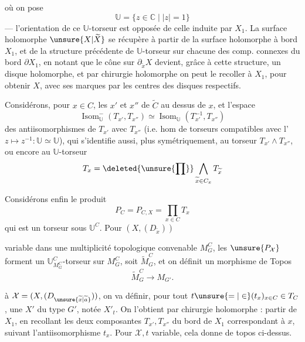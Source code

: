 où on pose
\[
\mathbb{U}=\{z\in\mathbb{C}\mid |z|=1\}
\]
--- l'orientation de ce $\mathbb{U}$-torseur  est opposée de celle induite par $X_1$.  La surface holomorphe $\unsure{X|\widetilde X}$  se récupère à partir de la surface holomorphe à bord $X_1$, et de la structure précédente de $\mathbb{U}$-torseur sur chacune des comp. connexes  du bord $\partial X_1$, en notant que le cône sur $\partial_{\widetilde x}X$  devient, grâce à cette structure, un disque  holomorphe, et par chirurgie holomorphe on peut le recoller à $X_1$, pour obtenir $X$, avec ses marques par les centres des disques respectifs.

Considérons, pour $x\in C$, les    $x'$ et $x''$ de $\widetilde C$ au dessus de $x$, et l'espace
\[
\operatorname{Isom}_{\mathbb{U}}^{-}(T_{x'},T_{x''})\simeq\operatorname{Isom}_{\mathbb{U}}(T_{x'}^{-1},T_{x''})
\]
des antiisomorphismes de $T_{x'}$ avec $T_{x''}$ (i.e. hom de torseurs compatibles avec l' $z\longmapsto z^{-1}:\mathbb{U}\simeq\mathbb{U}$), qui s'identifie aussi, plus symétriquement, au torseur $T_{x'}\wedge T_{x''}$, ou encore au $\mathbb{U}$-torseur
\[
T_x=\deleted{\unsure{\prod}}\mathop{\bigwedge}_{\widetilde x\in C_x}T_{\widetilde x}
\]

Considérons enfin le produit
\[
P_C=P_{C,X}=\prod_{x\in C}T_x
\]
qui est un torseur sous $\mathbb{U}^C$.  Pour $(X,(D_{\widetilde x}))$

variable dans une multiplicité topologique convenable $M_G^C$, les $\unsure{P_{\mathcal{X}}}$ forment un $\mathbb{U}_{M_G^C}^{C}$-torseur sur $M_G^C$, soit $\widetilde{M}_G^C$, et on définit un  morphisme de Topos
\[
\widetilde{M}_G^C\longrightarrow M_{G'}.
\]

 à $\mathcal{X}=(X,(D_{\unsure{\widetilde x|\widetilde a}}))$,  on va définir, pour tout $t\unsure{=|\in}(t_x)_{x\in C}\in T_C$, une  $X'$ du type $G'$, notée $X'_t$. On l'obtient par chirurgie holomorphe : partir de $X_1$, en recollant  les deux composantes  $T_{x'},T_{x''}$ du bord de $X_1$ correspondant à $x$, suivant l'antiisomorphisme $t_x$. Pour $\mathcal{X},t$ variable, cela donne  de topos ci-dessus.

